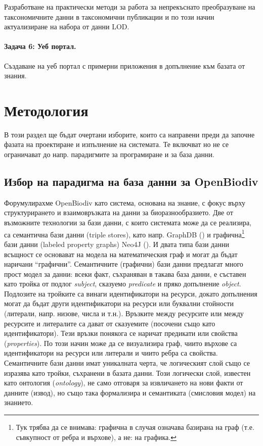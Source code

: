 Разработване на практически методи за работа за непрекъснато преобразуване на таксономичните данни в таксономични публикации и по този начин актуализиране на набора от данни LOD.

\paragraph{Задача 6: Уеб портал.} Създаване на уеб портал с примерни приложения в допълнение към базата от знания.

\section*{Методология}

В този раздел ще бъдат очертани изборите, които са направени преди да започне фазата на проектиране и изпълнение на системата. Те включват но не се ограничават до напр. парадигмите за програмиране и за база данни.

\subsection*{Избор на парадигма на база данни за OpenBiodiv}


Форумулирахме OpenBiodiv като система, основана на знание, с фокус върху структурирането и взаимовръзката на данни за биоразнообразието. Две от възможните технологии за бази данни, с които системата може да се реализира, са семантична бази данни (triple stores), като напр. GraphDB (\cite{ontotext_graphdb_2018}) и графична\footnote{Тук трябва да се внимава: графична в случая означава базирана на граф (т.е. съвкупност от ребра и върхове), а не: на графика.} бази данни (labeled property graphs) Neo4J (\cite{neo4j_developers_neo4j_2012}). И двата типа бази данни всъщност се основават на модела на математическия граф и могат да бъдат наричани ``графични''. Семантичните (графични) бази данни предлагат много прост модел за данни: всеки факт, съхраняван в такава база данни, е съставен като тройка от подлог \emph{subject}, сказуемо \emph{predicate} и пряко допълнение \emph{object}. Подлозите на тройките са винаги идентификатори на ресурси, докато допълнения могат да бъдат други идентификатори на ресурси или буквални стойности (литерали,  напр. низове, числа и т.н.). Връзките между ресурсите или между ресурсите и литералите са дават от сказуемите (посочени също като идентификатори). Тези връзки понякога се наричат предикати или свойства (\emph{properties}). По този начин може да се визуализира граф, чиито върхове са идентификатори на ресурси или литерали и чиито ребра са свойства. Семантичните бази данни имат уникалната черта, че логическият слой също се изразява като тройки, съхранени в базата данни. Този логически слой, известен като онтология (\emph {ontology}), не само отговаря за извличането на нови факти от данните (извод), но също така формализира и семантиката (смисловия модел) на знанието.

